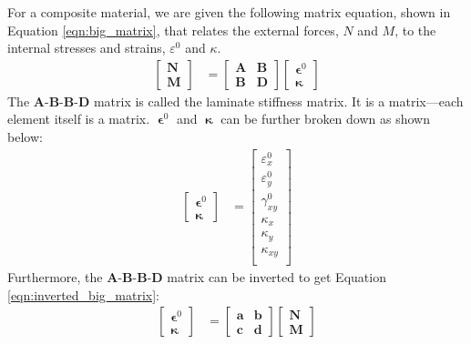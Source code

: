 \documentclass[12 pt]{article}
\begin{document}
For a composite material, we are given the following matrix equation, shown in Equation \ref{eqn:big_matrix}, that relates the external forces, $N$ and $M$, to the internal stresses and strains, $\varepsilon^0$ and $\kappa$.
\begin{align} \label{eqn:big_matrix}
	\begin{bmatrix}
		\textbf{N}\\
		\textbf{M}
	\end{bmatrix}
	&=
	\begin{bmatrix}
		\textbf{A}&\textbf{B}\\
		\textbf{B}&\textbf{D}
	\end{bmatrix}
	\begin{bmatrix}
		\boldsymbol{\upvarepsilon}^0\\
		\boldsymbol{\upkappa}
	\end{bmatrix}
\end{align}
The \textbf{A}-\textbf{B}-\textbf{B}-\textbf{D} matrix is called the laminate stiffness matrix. It is a  matrix---each element itself is a  matrix. $\boldsymbol{\upvarepsilon}^0$ and $\boldsymbol{\upkappa}$ can be further broken down as shown below:
\begin{align*}
	\begin{bmatrix}
		\boldsymbol{\upvarepsilon}^0\\
		\boldsymbol{\upkappa}
	\end{bmatrix}
	&=
	\begin{bmatrix}
		\varepsilon_x^0\\
		\varepsilon_y^0\\
		\gamma_{xy}^0\\
		\kappa_x\\
		\kappa_y\\
		\kappa_{xy}\\
	\end{bmatrix}
\end{align*}
Furthermore, the \textbf{A}-\textbf{B}-\textbf{B}-\textbf{D} matrix can be inverted to get Equation \ref{eqn:inverted_big_matrix}:
\begin{align} \label{eqn:inverted_big_matrix}
	\begin{bmatrix}
		\boldsymbol{\upvarepsilon}^0\\
		\boldsymbol{\upkappa}
	\end{bmatrix}
	&=
	\begin{bmatrix}
		\textbf{a}&\textbf{b}\\
		\textbf{c}&\textbf{d}
	\end{bmatrix}
	\begin{bmatrix}
		\textbf{N}\\
		\textbf{M}
	\end{bmatrix}
\end{align}
\end{document}

